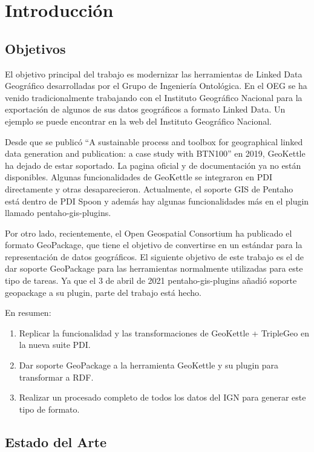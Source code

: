 \chapter{Introducción}

\section{Objetivos} El objetivo principal del trabajo es modernizar las herramientas
de Linked Data Geográfico desarrolladas por el Grupo de Ingeniería Ontológica. En el OEG se ha venido
tradicionalmente trabajando con el Instituto Geográfico Nacional para la exportación de algunos de sus datos
geográficos a formato Linked Data. Un ejemplo se puede encontrar en la web del Instituto Geográfico Nacional.
\cite{ign}

Desde que se publicó ``A sustainable process and toolbox for geographical linked data generation and publication:
a case study with BTN100'' en 2019\cite{toolbox}, GeoKettle ha dejado de estar soportado. La pagina oficial y de documentación
ya no están disponibles. Algunas funcionalidades de GeoKettle se integraron en PDI directamente y otras
desaparecieron. Actualmente, el soporte GIS de Pentaho está dentro de PDI Spoon y además hay algunas
funcionalidades más en el plugin llamado pentaho-gis-plugins\cite{gis-plugins}. 

Por otro lado, recientemente, el Open Geospatial Consortium ha publicado el formato GeoPackage, que tiene el
objetivo de convertirse en un estándar para la representación de datos geográficos. El siguiente objetivo de este
trabajo es el de dar soporte GeoPackage para las herramientas normalmente utilizadas para este tipo de tareas.
Ya que el 3 de abril de 2021 pentaho-gis-plugins añadió soporte geopackage a su plugin, parte del trabajo está
hecho.

En resumen:
\begin{enumerate} 
    \item Replicar la funcionalidad y las transformaciones de GeoKettle + TripleGeo en la nueva suite PDI. 
    \item Dar soporte GeoPackage a la herramienta GeoKettle y su plugin para transformar a RDF. 
    \item Realizar un procesado completo de todos los datos del IGN para generar este tipo de formato. 
\end{enumerate}

\section{Estado del Arte}


